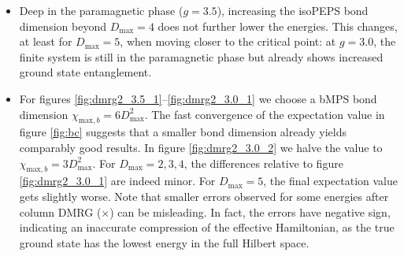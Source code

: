 \begin{itemize}
	\item Deep in the paramagnetic phase ($g = 3.5$), increasing the isoPEPS bond dimension beyond $D_{\text{max}} = 4$ does not further lower the energies. This changes, at least for $D_{\text{max}} = 5$, when moving closer to the critical point: at $g = 3.0$, the finite system is still in the paramagnetic phase but already shows increased ground state entanglement.
	\item For figures \ref{fig:dmrg2_3.5_1}--\ref{fig:dmrg2_3.0_1} we choose a bMPS bond dimension $\chi_{\text{max}, b} = 6D_{\text{max}}^2$. The fast convergence of the expectation value in figure \ref{fig:bc} suggests that a smaller bond dimension already yields comparably good results. In figure \ref{fig:dmrg2_3.0_2} we halve the value to $\chi_{\text{max}, b} = 3D_{\text{max}}^2$. For  $D_{\text{max}} = 2, 3, 4$, the differences relative to figure \ref{fig:dmrg2_3.0_1} are indeed minor. For  $D_{\text{max}} = 5$, the final expectation value gets slightly worse. Note that smaller errors observed for some energies after column DMRG ($\times$) can be misleading. In fact, the errors have negative sign, indicating an inaccurate compression of the effective Hamiltonian, as the true ground state has the lowest energy in the full Hilbert space.
\end{itemize}

